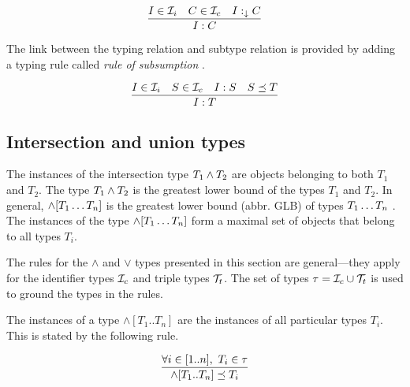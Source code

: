 \documentclass[runningheads]{llncs}
\newcommand{\darr}{\downarrow}
\newcommand{\I}{{\cal I}}
\newcommand{\T}{{\cal T}}
\newcommand{\memo}[1]{}
\begin{document}
\begin{equation}
\dfrac{I\in\I_i \quad C\in\I_c \quad I:_\darr\/C}
      {I:C}
\end{equation}

The link between the typing relation and subtype relation is provided
by adding a typing rule called \emph{rule of subsumption}
\cite{Pierce2002}.

\begin{equation}
\label{rul:typing-subsumption}
\dfrac{I\in\I_i\quad S\in\I_c\quad I:S \quad S\preceq\/T}
      {I:T}    
\end{equation}


\memo{Properties have dual role: they are instances and types at the same time.}
\memo{Present the features of properties from this point of view.}






\subsection{Intersection and union types\label{sec:intsc-union}}

The instances of the intersection type $T_1\land\/T_2$ are objects
belonging to both $T_1$ and $T_2$. The type $T_1\land\/T_2$ is the
greatest lower bound of the types $T_1$ and $T_2$. In general,
$\land[T_1\ldots\/T_n]$ is the greatest lower bound (abbr. GLB) of
types $T_1\ldots\/T_n$ \cite{Pierce1991,Pierce1996}. The instances of
the type $\land[T_1\ldots\/T_n]$ form a maximal set of objects that
belong to all types $T_i$.

The rules for the $\land$ and $\lor$ types presented in this section
are general---they apply for the identifier types $\I_c$ and triple
types $\T_t$. The set of types $\tau=\I_c\cup\T_t$ is used to ground
the types in the rules.

The instances of a type $\land[T_1..T_n]$ are the instances of all
particular types $T_i$. This is stated by the following rule. 

\memo{\begin{equation}
\dfrac{T_1,T_2\in\tau}
      {T_1\land\/T_2\preceq\/T_1}
\end{equation}

\begin{equation}
\dfrac{T_1,T_2\in\tau}
      {T_1\land\/T_2\preceq\/T_2}
\end{equation}}

\begin{equation}
\dfrac{\forall\/i\in[1..n],\ T_i\in\tau}
      {\land[T_1..\/T_n] \preceq\/T_i} 
\end{equation}
\end{document}
